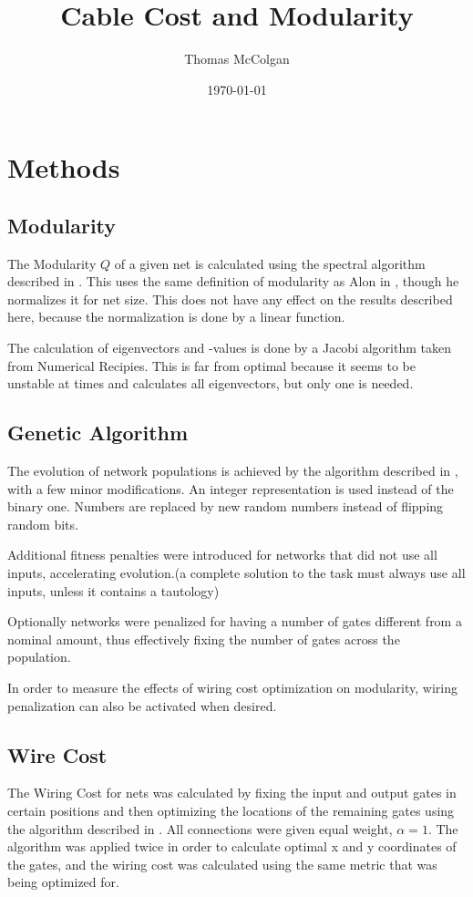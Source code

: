 \documentclass[12pt,a4paper]{article}
\begin{document}
\title{Cable Cost and Modularity}
\author{Thomas McColgan}
\date{\today}
\maketitle

\section{Methods}

\subsection{Modularity}
The Modularity $Q$ of a given net is calculated using the spectral algorithm described in \cite{newman}. This uses the same definition of modularity as Alon in  \cite{alon}, though he normalizes it for net size. This does not have any effect on the results described here, because the normalization is done by a linear function.

The calculation of eigenvectors and -values is done by a Jacobi algorithm taken from Numerical Recipies. This is far from optimal because it seems to be unstable at times and calculates all eigenvectors, but only one is needed.

\subsection{Genetic Algorithm}
The evolution of network populations is achieved by the algorithm described in  \cite{alon}, with a few minor modifications. An integer representation is used instead of the binary one. Numbers are replaced by new random numbers instead of flipping random bits.

Additional fitness penalties were introduced for networks that did not use all inputs, accelerating evolution.(a complete solution to the task must always use all inputs, unless it contains a tautology)

Optionally networks were penalized for having a number of gates different from a nominal amount, thus effectively fixing the number of gates across the population.

In order to measure the effects of wiring cost optimization on modularity, wiring penalization can also be activated when desired.

\subsection{Wire Cost}
The Wiring Cost for nets was calculated by fixing the input and output gates in certain positions and then optimizing the locations of the remaining gates using the algorithm described in  \cite{elegans}. All connections were given equal weight, $\alpha=1$. The algorithm was applied twice in order to calculate optimal x and y coordinates of the gates, and the wiring cost was calculated using the same metric that was being optimized for.
\end{document}
